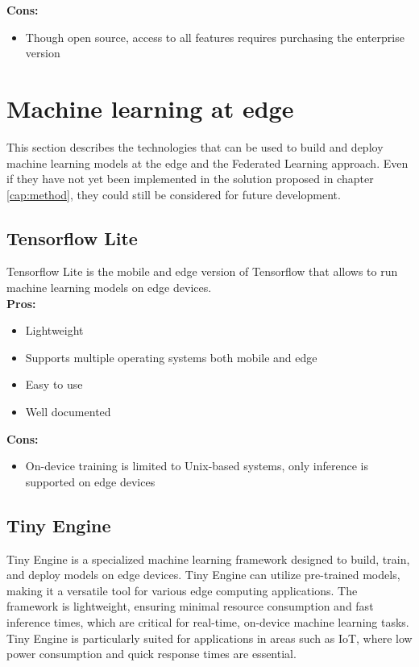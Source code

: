 \textbf{Cons:}
\begin{itemize}
    \item Though open source, access to all features requires purchasing the enterprise version
\end{itemize}

\section{Machine learning at edge} 
This section describes the technologies that can be used to build and deploy machine learning models at the edge and the Federated Learning approach. Even if they have not yet been implemented in the solution proposed in chapter \ref{cap:method}, they could still be considered for future development.

\subsection*{Tensorflow Lite}
\label{tensorflow-lite}
Tensorflow Lite\cite{site:tflite} is the mobile and edge version of Tensorflow\cite{site:tensorflow} that allows to run machine learning models on edge devices.\\
\textbf{Pros:}
\begin{itemize}
    \item Lightweight
    \item Supports multiple operating systems both mobile and edge
    \item Easy to use
    \item Well documented
\end{itemize}
\textbf{Cons:}
\begin{itemize}
    \item On-device training is limited to Unix-based systems, only inference is supported on edge devices
\end{itemize}

\subsection*{Tiny Engine}
\label{tiny-engine}
Tiny Engine\cite{site:tinyengine}\cite{lin2022ondevice} is a specialized machine learning framework designed to build, train, and deploy models on edge devices. Tiny Engine can utilize pre-trained models, making it a versatile tool for various edge computing applications. The framework is lightweight, ensuring minimal resource consumption and fast inference times, which are critical for real-time, on-device machine learning tasks. Tiny Engine is particularly suited for applications in areas such as IoT, where low power consumption and quick response times are essential.

